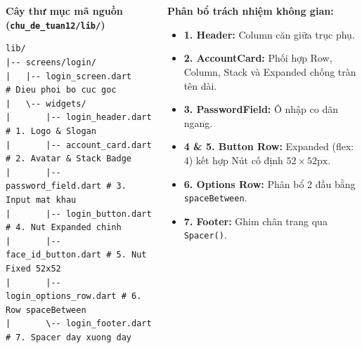 \documentclass[aspectratio=169, 10pt]{beamer}
\newcommand{\SlideHeader}[2]{%
  \noindent{\textcolor{AccentOrange}{\textbf{\footnotesize #1}}}\\[0.08cm]
  \noindent{\Large \textbf{\textcolor{NavyTitle}{#2}}}\\[0.22cm]
}
\begin{document}
\begin{frame}[fragile]
  \SlideHeader{YÊU CẦU THỰC HÀNH}{Thiết Kế Cấu Trúc Bố Cục Dự Án Demo 7 Thành Phần}

  \begin{columns}[T]
    \begin{column}{0.52\textwidth}
      \textbf{Cây thư mục mã nguồn (\texttt{chu\_de\_tuan12/lib/})}
\begin{lstlisting}[numbers=none, basicstyle=\ttfamily\tiny]
lib/
|-- screens/login/
|   |-- login_screen.dart       # Dieu phoi bo cuc goc
|   \-- widgets/
|       |-- login_header.dart   # 1. Logo & Slogan
|       |-- account_card.dart   # 2. Avatar & Stack Badge
|       |-- password_field.dart # 3. Input mat khau
|       |-- login_button.dart   # 4. Nut Expanded chinh
|       |-- face_id_button.dart # 5. Nut Fixed 52x52
|       |-- login_options_row.dart # 6. Row spaceBetween
|       \-- login_footer.dart   # 7. Spacer day xuong day
\end{lstlisting}
    \end{column}

    \begin{column}{0.46\textwidth}
      \textbf{Phân bổ trách nhiệm không gian:}
      \begin{itemize}
        \item \textbf{1. Header:} Column căn giữa trục phụ.
        \item \textbf{2. AccountCard:} Phối hợp Row, Column, Stack và Expanded chống tràn tên dài.
        \item \textbf{3. PasswordField:} Ô nhập co dãn ngang.
        \item \textbf{4 \& 5. Button Row:} Expanded (flex: 4) kết hợp Nút cố định $52 \times 52\text{px}$.
        \item \textbf{6. Options Row:} Phân bổ 2 đầu bằng \texttt{spaceBetween}.
        \item \textbf{7. Footer:} Ghim chân trang qua \texttt{Spacer()}.
      \end{itemize}
    \end{column}
  \end{columns}
\end{frame}
\end{document}
